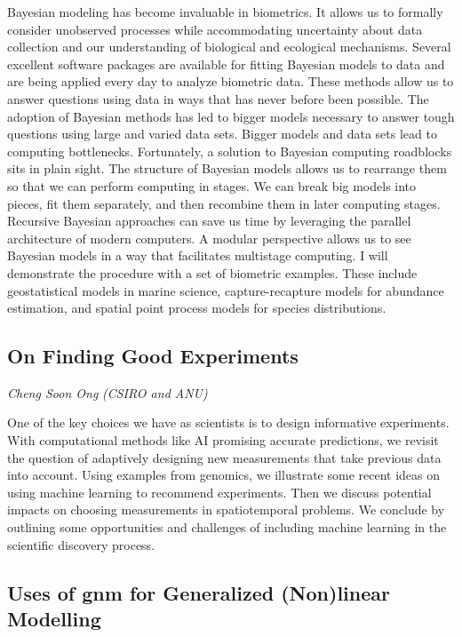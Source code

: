 \documentclass[
]{scrreprt}
\begin{document}
Bayesian modeling has become invaluable in biometrics. It allows us to
formally consider unobserved processes while accommodating uncertainty
about data collection and our understanding of biological and ecological
mechanisms. Several excellent software packages are available for
fitting Bayesian models to data and are being applied every day to
analyze biometric data. These methods allow us to answer questions using
data in ways that has never before been possible. The adoption of
Bayesian methods has led to bigger models necessary to answer tough
questions using large and varied data sets. Bigger models and data sets
lead to computing bottlenecks. Fortunately, a solution to Bayesian
computing roadblocks sits in plain sight. The structure of Bayesian
models allows us to rearrange them so that we can perform computing in
stages. We can break big models into pieces, fit them separately, and
then recombine them in later computing stages. Recursive Bayesian
approaches can save us time by leveraging the parallel architecture of
modern computers. A modular perspective allows us to see Bayesian models
in a way that facilitates multistage computing. I will demonstrate the
procedure with a set of biometric examples. These include geostatistical
models in marine science, capture-recapture models for abundance
estimation, and spatial point process models for species distributions.

\subsection{On Finding Good
Experiments}\label{on-finding-good-experiments}

\emph{Cheng Soon Ong} \emph{(CSIRO and ANU)}

\setlength{\parskip}{0.5em}

One of the key choices we have as scientists is to design informative
experiments. With computational methods like AI promising accurate
predictions, we revisit the question of adaptively designing new
measurements that take previous data into account. Using examples from
genomics, we illustrate some recent ideas on using machine learning to
recommend experiments. Then we discuss potential impacts on choosing
measurements in spatiotemporal problems. We conclude by outlining some
opportunities and challenges of including machine learning in the
scientific discovery process.

\subsection{Uses of gnm for Generalized (Non)linear
Modelling}\label{uses-of-gnm-for-generalized-nonlinear-modelling}
\end{document}
